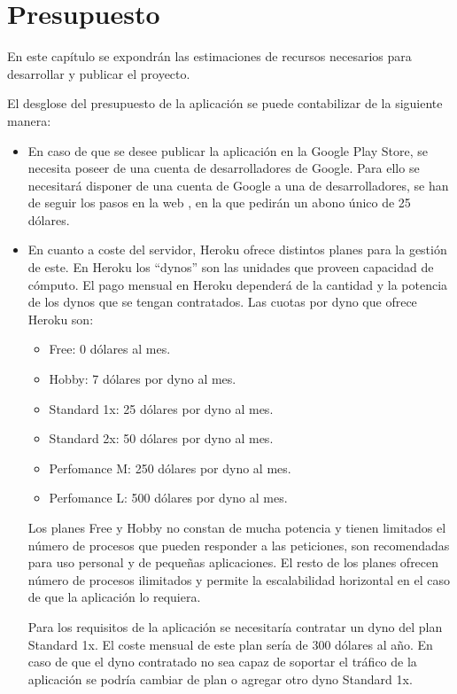 
\chapter{Presupuesto} \label{chap:RAEntornosUniversitarios} 

En este capítulo se expondrán las estimaciones de recursos necesarios para
desarrollar y publicar el proyecto.

El desglose del presupuesto de la aplicación se puede contabilizar de la siguiente manera:

\begin{itemize}
    \item En caso de que se desee publicar la aplicación en la Google Play Store, se necesita poseer de una cuenta de desarrolladores de Google. Para ello se necesitará disponer de una cuenta de Google a una de desarrolladores, se han de seguir los pasos en la web \cite{URL::googleplayconsole}, en la que pedirán un abono único de 25 dólares.  
    \item En cuanto a coste del servidor, Heroku ofrece distintos planes para la gestión de este.  En Heroku los ``dynos'' son las unidades que proveen capacidad de cómputo. El pago mensual en Heroku dependerá de la cantidad y la potencia de los dynos que se tengan contratados. Las cuotas por dyno que ofrece Heroku son:
    \begin{itemize}
        \item Free: 0 dólares al mes. 
        \item Hobby: 7 dólares por dyno al mes.
        \item Standard 1x: 25 dólares por dyno al mes.
        \item Standard 2x: 50 dólares por dyno al mes.
        \item Perfomance M: 250 dólares por dyno al mes.
        \item Perfomance L: 500 dólares por dyno al mes.
    \end{itemize}
    
    Los planes Free y Hobby no constan de mucha potencia y tienen limitados el número de procesos que pueden responder a las peticiones, son recomendadas para uso personal y de pequeñas aplicaciones. El resto de los planes ofrecen número de procesos ilimitados y permite la escalabilidad horizontal en el caso de que la aplicación lo requiera.

    Para los requisitos de la aplicación se necesitaría contratar  un dyno del plan Standard 1x. El coste mensual de este plan sería de 300 dólares al año.
    En caso de que el dyno contratado no sea capaz de soportar el tráfico de la aplicación se podría cambiar de plan o agregar otro dyno Standard 1x. 


\end{itemize}
